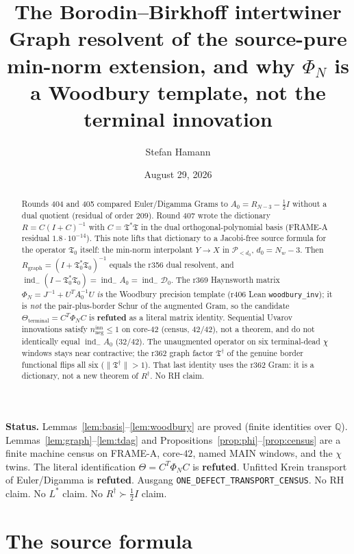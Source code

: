 \documentclass[11pt]{article}
\title{\bfseries The Borodin--Birkhoff intertwiner\\[2mm]
\large Graph resolvent of the source-pure min-norm extension,
and why $\Phi_N$ is a Woodbury template, not the terminal
innovation}
\author{Stefan Hamann}
\date{August 29, 2026}
\theoremstyle{remark}
\newcommand{\indm}{\operatorname{ind}_{-}}
\newcommand{\half}{\tfrac12}
\newcommand{\Tfrak}{\mathfrak{T}}
\newcommand{\cD}{\mathcal{D}}
\begin{document}
\maketitle

\begin{abstract}\noindent
Rounds 404 and 405 compared Euler/Digamma Grams to
$A_0=R_{N-3}-\half I$ without a dual quotient
(residual of order $209$).
Round 407 wrote the dictionary $R=C(I+C)^{-1}$ with
$C=\Tfrak^*\Tfrak$ in the dual orthogonal-polynomial basis
(FRAME-A residual $1.8\cdot 10^{-14}$).
This note lifts that dictionary to a Jacobi-free source
formula for the operator $\Tfrak_0$ itself: the min-norm
interpolant $Y\to X$ in $\mathcal{P}_{<d_0}$, $d_0=N_w-3$.
Then $R_{\mathrm{graph}}=(I+\Tfrak_0^*\Tfrak_0)^{-1}$ equals
the r356 dual resolvent, and
$\indm(I-\Tfrak_0^*\Tfrak_0)=\indm A_0=\indm\cD_0$.
The r369 Haynsworth matrix $\Phi_N=J^{-1}+U^TA_0^{-1}U$
\emph{is} the Woodbury precision template (r406 Lean
\texttt{woodbury\_inv}); it is \emph{not} the pair-plus-border
Schur of the augmented Gram, so the candidate
$\Theta_{\mathrm{terminal}}=C^T\Phi_N C$ is
\textbf{refuted} as a literal matrix identity.
Sequential Uvarov innovations satisfy $n_{\mathrm{neg}}^{\mathrm{inn}}\le 1$
on core-$42$ (census, $42/42$), not a theorem, and do not
identically equal $\indm A_0$ ($32/42$).
The unaugmented operator on six terminal-dead $\chi$
windows stays near contractive; the r362 graph factor
$\Tfrak^\dagger$ of the genuine border functional flips all
six ($\|\Tfrak^\dagger\|>1$).
That last identity uses the r362 Gram: it is a dictionary,
not a new theorem of $R^\dagger$.
No RH claim.
\end{abstract}

\medskip\noindent
\textbf{Status.}\enspace
Lemmas~\ref{lem:basis}--\ref{lem:woodbury} are proved (finite
identities over $\mathbb{Q}$).
Lemmas~\ref{lem:graph}--\ref{lem:tdag} and
Propositions~\ref{prop:phi}--\ref{prop:census} are a finite
machine census on FRAME-A, core-$42$, named MAIN windows, and
the $\chi$ twins.
The literal identification $\Theta=C^T\Phi_N C$ is
\textbf{refuted}.
Unfitted Krein transport of Euler/Digamma is
\textbf{refuted}.
Ausgang \texttt{ONE\_DEFECT\_TRANSPORT\_CENSUS}.
No RH claim.  No $L^*$ claim.  No $R^\dagger\succ\half I$ claim.

\section{The source formula}\label{sec:formula}
\end{document}
